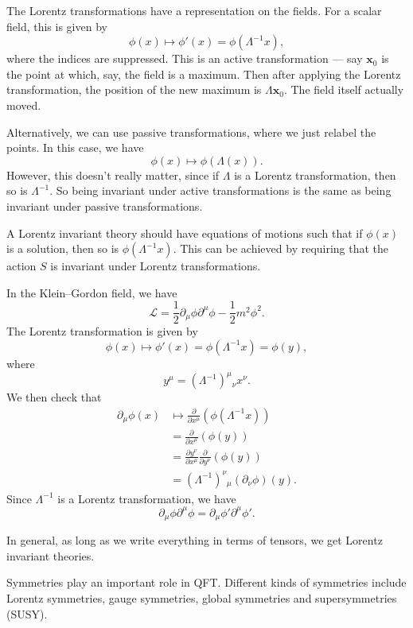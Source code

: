\documentclass[a4paper]{article}
\begin{document}
The Lorentz transformations have a representation on the fields. For a scalar field, this is given by
\[
  \phi(x) \mapsto \phi'(x) = \phi(\Lambda^{-1}x),
\]
where the indices are suppressed. This is an active transformation --- say $\mathbf{x}_0$ is the point at which, say, the field is a maximum. Then after applying the Lorentz transformation, the position of the new maximum is $\Lambda \mathbf{x}_0$. The field itself actually moved.

Alternatively, we can use passive transformations, where we just relabel the points. In this case, we have
\[
  \phi(x) \mapsto \phi(\Lambda (x)).
\]
However, this doesn't really matter, since if $\Lambda$ is a Lorentz transformation, then so is $\Lambda^{-1}$. So being invariant under active transformations is the same as being invariant under passive transformations.

A Lorentz invariant theory should have equations of motions such that if $\phi(x)$ is a solution, then so is $\phi(\Lambda^{-1} x)$. This can be achieved by requiring that the action $S$ is invariant under Lorentz transformations.

\begin{eg}
  In the Klein--Gordon field, we have
  \[
    \mathcal{L} = \frac{1}{2} \partial_\mu \phi \partial^\mu \phi - \frac{1}{2}m^2 \phi^2.
  \]
  The Lorentz transformation is given by
  \[
    \phi(x) \mapsto \phi'(x) = \phi(\Lambda^{-1}x) = \phi(y),
  \]
  where
  \[
    y^\mu = (\Lambda^{-1})^\mu\!_\nu x^\nu.
  \]
  We then check that
  \begin{align*}
    \partial_\mu \phi(x) &\mapsto \frac{\partial}{\partial x^\mu}(\phi(\Lambda^{-1}x)) \\
    &= \frac{\partial}{\partial x^\mu} (\phi(y))\\
    &= \frac{\partial y^\nu}{\partial x^\mu} \frac{\partial}{\partial y^\nu} (\phi(y))\\
    &= (\Lambda^{-1})^\nu\!_\mu(\partial_\nu \phi)(y).
  \end{align*}
  Since $\Lambda^{-1}$ is a Lorentz transformation, we have
  \[
    \partial_\mu \phi \partial^\mu \phi = \partial_\mu \phi' \partial^\mu \phi'.
  \]
\end{eg}
In general, as long as we write everything in terms of tensors, we get Lorentz invariant theories.

Symmetries play an important role in QFT. Different kinds of symmetries include Lorentz symmetries, gauge symmetries, global symmetries and supersymmetries (SUSY).
\end{document}
